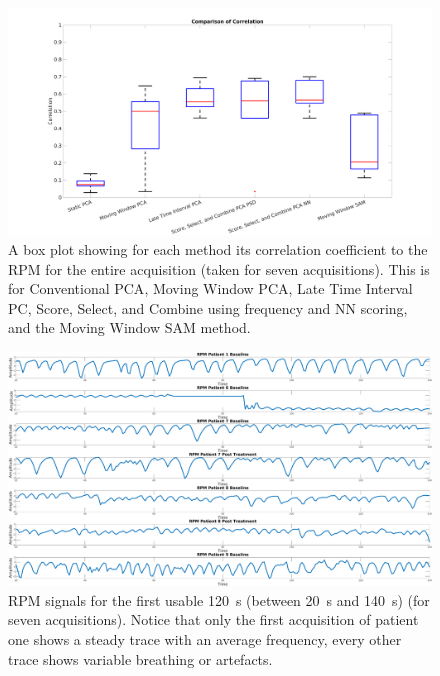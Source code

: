             \begin{figure}
                \centering
                
                \includegraphics[width=1.0\linewidth]{figures/data_driven_surrogate_signal_extraction_methods_1_box_plot_all.png}
                
                \captionsetup{singlelinecheck=false}
                \caption{
                    A box plot showing for each method its correlation coefficient to the \gls{RPM} for the entire acquisition (taken for seven acquisitions). This is for Conventional \gls{PCA}, Moving Window \gls{PCA}, Late Time Interval \gls{PC}, Score, Select, and Combine using frequency and \gls{NN} scoring, and the Moving Window \gls{SAM} method.
                }
                \label{fig:box_plot_all}
            \end{figure}
            
            \begin{figure}
                \centering
                
                \includegraphics[width=1.0\linewidth]{figures/data_driven_surrogate_signal_extraction_methods_1_rpm_signals.png}
                
                \captionsetup{singlelinecheck=false}
                \caption{
                    \gls{RPM} signals for the first usable \SI{120}{\second} (between \SI{20}{\second} and \SI{140}{\second}) (for seven acquisitions). Notice that only the first acquisition of patient one shows a steady trace with an average frequency, every other trace shows variable breathing or artefacts.
                }
                \label{fig:rpm_signals}
            \end{figure}
            
